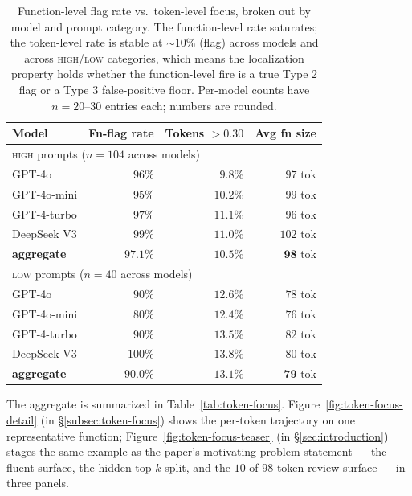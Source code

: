 \begin{table}[h]
\centering
\small
\begin{tabular}{l r r r}
\toprule
\textbf{Model} & \textbf{Fn-flag rate} & \textbf{Tokens $>0.30$}
 & \textbf{Avg fn size} \\
\midrule
\multicolumn{4}{l}{\textsc{high} prompts ($n=104$ across models)} \\
\midrule
GPT-4o        & $96\%$ & $9.8\%$  & $97$ tok \\
GPT-4o-mini   & $95\%$ & $10.2\%$ & $99$ tok \\
GPT-4-turbo   & $97\%$ & $11.1\%$ & $96$ tok \\
DeepSeek V3   & $99\%$ & $11.0\%$ & $102$ tok \\
\addlinespace
\textbf{aggregate} & $\mathbf{97.1\%}$ & $\mathbf{10.5\%}$
   & $\mathbf{98}$ tok \\
\midrule
\multicolumn{4}{l}{\textsc{low} prompts ($n=40$ across models)} \\
\midrule
GPT-4o        & $90\%$  & $12.6\%$ & $78$ tok \\
GPT-4o-mini   & $80\%$  & $12.4\%$ & $76$ tok \\
GPT-4-turbo   & $90\%$  & $13.5\%$ & $82$ tok \\
DeepSeek V3   & $100\%$ & $13.8\%$ & $80$ tok \\
\addlinespace
\textbf{aggregate} & $\mathbf{90.0\%}$ & $\mathbf{13.1\%}$
   & $\mathbf{79}$ tok \\
\bottomrule
\end{tabular}
\caption{Function-level flag rate vs.\ token-level focus, broken out
by model and prompt category. The function-level rate saturates; the
token-level rate is stable at $\sim 10\%$ (flag) across models and
across \textsc{high}/\textsc{low} categories, which means the
localization property holds whether the function-level fire is a
true Type 2 flag or a Type 3 false-positive floor. Per-model counts
have $n=20$--$30$ entries each; numbers are rounded.}
\label{tab:token-focus-per-model}
\end{table}

The aggregate is summarized in Table~\ref{tab:token-focus}.
Figure~\ref{fig:token-focus-detail} (in \S\ref{subsec:token-focus})
shows the per-token trajectory on one representative function;
Figure~\ref{fig:token-focus-teaser} (in \S\ref{sec:introduction})
stages the same example as the paper's motivating problem statement
--- the fluent surface, the hidden top-$k$ split, and the
$10$-of-$98$-token review surface --- in three panels.

